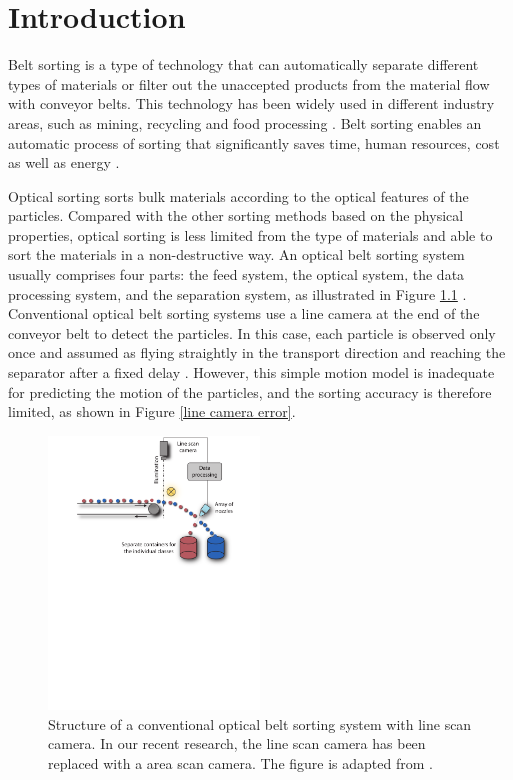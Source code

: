 \chapter{Introduction}

Belt sorting is a type of technology that can automatically separate different types of materials or filter out the unaccepted products from the material flow with conveyor belts. This technology has been widely used in different industry areas, such as mining, recycling \cite{pfaff2015tracksort} and food processing \cite{edwards2004detecting}. Belt sorting enables an automatic process of sorting that significantly saves time, human resources, cost as well as energy \cite{zsifkovits2020state}.

Optical sorting sorts bulk materials according to the optical features of the particles. Compared with the other sorting methods based on the physical properties, optical sorting is less limited from the type of materials and able to sort the materials in a non-destructive way. An optical belt sorting system usually comprises four parts: the feed system, the optical system, the data processing system, and the separation system, as illustrated in Figure \ref{belt sort system old} \cite{edwards2004detecting}. Conventional optical belt sorting systems use a line camera at the end of the conveyor belt to detect the particles. In this case, each particle is observed only once and assumed as flying straightly in the transport direction and reaching the separator after a fixed delay \cite{wotruba2008stand}. However, this simple motion model is inadequate for predicting the motion of the particles, and the sorting accuracy is therefore limited, as shown in Figure \ref{line camera error}.

\begin{figure}[htb]
\centering
\includegraphics[width=0.5\textwidth]{figures/sort system old.pdf}
\caption{Structure of a conventional optical belt sorting system with line scan camera. In our recent research, the line scan camera has been replaced with a area scan camera. The figure is adapted from \cite{pfaff2017improving}.}
\label{belt sort system old}
\end{figure}

